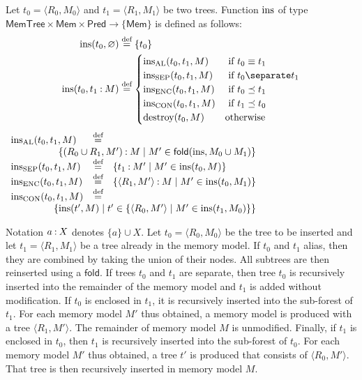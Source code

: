 \begin{definition}\label{def:insert}
  Let $t_0 = \langle R_0,M_0\rangle$ and $t_1 = \langle R_1,M_1\rangle$ be two trees. Function
  $\operatorname{ins}$ of type $\mathsf{MemTree}\times\mathsf{Mem}\times\mathsf{Pred}\rightarrow\{\mathsf{Mem}\}$
  is defined as follows:
  \begin{align*}
    \insertM(t_0,\varnothing) &\defeq \{t_0\}\notag \\
    \insertM(t_0,t_1\cons M) &\defeq \begin{cases}
      \insertM_\text{AL}(t_0,t_1,M) & \text{ if } t_0\equiv t_1 \\
      \insertM_\text{SEP}(t_0,t_1,M) & \text{ if } t_0\separate t_1 \\
      \insertM_\text{ENC}(t_0,t_1,M) & \text{ if } t_0\preceq t_1 \\
      \insertM_\text{CON}(t_0,t_1,M) & \text{ if } t_1\preceq t_0 \\
      \mbox{destroy}(t_0, M)  & \text{otherwise}
    \end{cases}
  \end{align*}$
  \begin{array}{lcl}
    \insertM_\text{AL}(t_0,t_1,M) &\defeq& \\
    \multicolumn{3}{r}{\{(R_0\cup R_1, M') \cons M \mid M' \in \mathsf{fold}(\insertM, M_0 \cup M_1) \}} \\
    \insertM_\text{SEP}(t_0,t_1,M) &\defeq& \{t_1\cons M'\mid M'\in\insertM(t_0,M)\} \\
    \insertM_\text{ENC}(t_0,t_1,M) &\defeq& \{\langle R_1,M'\rangle\cons M\mid M'\in\insertM(t_0,M_1)\} \\
    \insertM_\text{CON}(t_0,t_1,M) &\defeq& \\
    \multicolumn{3}{r}{ \{\insertM(t',M)\mid t'\in\{\langle R_0,M'\rangle\mid M'\in \insertM(t_1,M_0)\}\}}
  \end{array}$
\end{definition}

Notation $a \mathbin{:} X$ denotes $\{a\} \cup X$.
Let $t_0 = \langle R_0,M_0\rangle$ be the tree to be inserted and let $t_1 = \langle R_1,M_1\rangle$ be a tree already in the memory model.
If $t_0$ and $t_1$ alias, then they are combined by taking the union of their nodes.
All subtrees are then reinserted using a $\mathsf{fold}$.
If trees $t_0$ and $t_1$ are separate, then tree $t_0$ is recursively inserted into the remainder of the memory model and $t_1$ is added without modification.
If $t_0$ is enclosed in $t_1$, it is recursively inserted into the sub-forest of $t_1$.
For each memory model $M'$ thus obtained, a memory model is produced with a tree $\langle R_1,M'\rangle$.
The remainder of memory model $M$ is unmodified.
Finally, if $t_1$ is enclosed in $t_0$, then $t_1$ is recursively inserted into the sub-forest of $t_0$.
For each memory model $M'$ thus obtained, a tree $t'$ is produced that consists of $\langle R_0,M'\rangle$.
That tree is then recursively inserted in memory model $M$.



